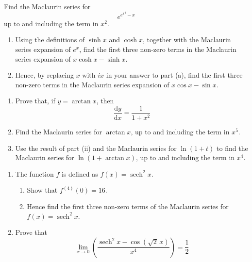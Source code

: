 \documentclass[leqno]{article}
\begin{document}
\begin{enumerate}[
  label=\textbf{\arabic*.},
  leftmargin=*,
  topsep=0pt,
  partopsep=0pt,
  parsep=0pt
]
Find the Maclaurin series for \[e^{e^{x^2}-x}\] up to and including the term in $x^2$. 

\newpage

\questionitem

\begin{enumerate}[label=\textbf{(\alph*)}]
  \item Using the definitions of $\sinh x$ and $\cosh x$, together with the Maclaurin series expansion of $e^x$, find the first three non-zero terms in the Maclaurin series expansion of $x\cosh x-\sinh x$.  \\
  \item Hence, by replacing $x$ with $ix$ in your answer to part (a), find the first three non-zero terms in the Maclaurin series expansion of $x\cos x-\sin x$.  \\
\end{enumerate}

\newpage

\questionitem

\begin{enumerate}[label=\textbf{(\roman*)}]
  \item Prove that, if $y=\arctan x$, then
  \[
  \frac{\mathrm{d}y}{\mathrm{d}x}=\frac{1}{1+x^2}
  \]
  \item Find the Maclaurin series for $\arctan x$, up to and including the term in $x^5$.  \\
  \item Use the result of part (ii) and the Maclaurin series for $\ln(1+t)$ to find the Maclaurin series for $\ln(1+\arctan x)$, up to and including the term in $x^4$.  \\
\end{enumerate}

\newpage

\questionitem

\begin{enumerate}[label=\textbf{(\alph*)}]
  \item The function $f$ is defined as $f(x)=\operatorname{sech}^2 x$. \\
  \begin{enumerate}[label=(\roman*)]
    \item Show that $f^{(4)}(0)=16$. 
    \item Hence find the first three non-zero terms of the Maclaurin series for $f(x)=\operatorname{sech}^2 x$.  \\
  \end{enumerate}
  \item Prove that
  \[
  \lim_{x\to 0}\left(\frac{\operatorname{sech}^2 x-\cos(\sqrt{2}\,x)}{x^4}\right)=\frac{1}{2}
  \]
\end{enumerate}


\end{enumerate}
\end{document}
